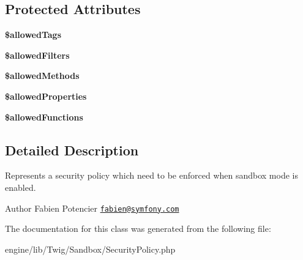 \subsection*{Protected Attributes}
\begin{DoxyCompactItemize}
\item 
\hypertarget{class_twig___sandbox___security_policy_a6698925f702315b0cf824a8edec00cb0}{}{\bfseries \$allowed\+Tags}\label{class_twig___sandbox___security_policy_a6698925f702315b0cf824a8edec00cb0}

\item 
\hypertarget{class_twig___sandbox___security_policy_a9ade06c5df1d0cd5cec2deac61093e99}{}{\bfseries \$allowed\+Filters}\label{class_twig___sandbox___security_policy_a9ade06c5df1d0cd5cec2deac61093e99}

\item 
\hypertarget{class_twig___sandbox___security_policy_ab278eba7cab5341dacdccecd7a2cc2df}{}{\bfseries \$allowed\+Methods}\label{class_twig___sandbox___security_policy_ab278eba7cab5341dacdccecd7a2cc2df}

\item 
\hypertarget{class_twig___sandbox___security_policy_af097fa346e31c5a6718eb792e966980b}{}{\bfseries \$allowed\+Properties}\label{class_twig___sandbox___security_policy_af097fa346e31c5a6718eb792e966980b}

\item 
\hypertarget{class_twig___sandbox___security_policy_ac1d7a89bbd6e44a7c9908b684055481f}{}{\bfseries \$allowed\+Functions}\label{class_twig___sandbox___security_policy_ac1d7a89bbd6e44a7c9908b684055481f}

\end{DoxyCompactItemize}


\subsection{Detailed Description}
Represents a security policy which need to be enforced when sandbox mode is enabled.

\begin{DoxyAuthor}{Author}
Fabien Potencier \href{mailto:fabien@symfony.com}{\tt fabien@symfony.\+com} 
\end{DoxyAuthor}


The documentation for this class was generated from the following file\+:\begin{DoxyCompactItemize}
\item 
engine/lib/\+Twig/\+Sandbox/Security\+Policy.\+php\end{DoxyCompactItemize}

